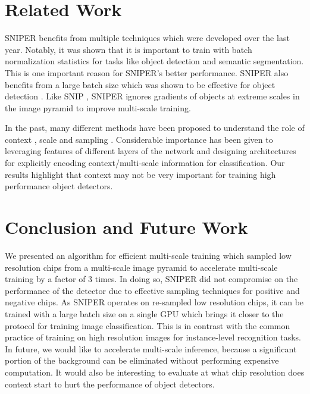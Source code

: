 \documentclass{article}
\begin{document}
\section{Related Work}
SNIPER benefits from multiple techniques which were developed over the last year. Notably, it was shown that it is important to train with batch normalization statistics \cite{peng2017megdet,liu2018path,zhao2017pyramid} for tasks like object detection and semantic segmentation. This is one important reason for SNIPER's better performance. SNIPER also benefits from a large batch size which was shown to be effective for object detection \cite{peng2017megdet}. Like SNIP \cite{singh2017analysis}, SNIPER ignores gradients of objects at extreme scales in the image pyramid to improve  multi-scale training. 


In the past, many different methods have been proposed to understand the role of context \cite{yu2015multi,bell2016inside,mottaghi2014role}, scale \cite{cai2016unified,yang2016exploit,lin2017feature, najibi2017ssh} and sampling \cite{lin2018focal,shrivastava2016training,boda2017sampling,boda2018universal}. Considerable importance has been given to leveraging features of different layers of the network and designing architectures for explicitly encoding context/multi-scale information \cite{najibi2017ssh,liu2016ssd,zagoruyko2016multipath,zeng2017crafting} for classification. Our results highlight that context may not be very important for training high performance object detectors. 



\section{Conclusion and Future Work}
We presented an algorithm for efficient multi-scale training which sampled low resolution chips from a multi-scale image pyramid to accelerate multi-scale training by a factor of 3 times. In doing so, SNIPER did not compromise on the performance of the detector due to effective sampling techniques for positive and negative chips. As SNIPER operates on re-sampled low resolution chips, it can be trained with a large batch size on a single GPU which brings it closer to the protocol for training image classification. This is in contrast with the common practice of training on high resolution images for instance-level recognition tasks. In future, we would like to accelerate multi-scale inference, because a significant portion of the background can be eliminated without performing expensive computation. It would also be interesting to evaluate at what chip resolution does context start to hurt the performance of object detectors.
\end{document}
